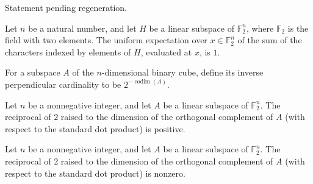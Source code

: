 \begin{theorem}
\label{FABL.subspaceCharacterSum_eq_zero_of_not_mem}
\leanok
{}
Statement pending regeneration.
\end{theorem}

\begin{theorem}
\label{FABL.expect_subspaceCharacterSum}
\leanok
{}
Let $n$ be a natural number, and let $H$ be a linear subspace of $\mathbb{F}_2^n$, where
$\mathbb{F}_2$ is the field with two elements. The uniform expectation over
$x\in\mathbb{F}_2^n$ of the sum of the characters indexed by elements of $H$, evaluated
at $x$, is $1$.
\end{theorem}

\begin{definition}
\label{FABL.inversePerpendicularCard}
\leanok
{}
For a subspace $A$ of the $n$-dimensional binary cube, define its inverse perpendicular
cardinality to be $2^{-\operatorname{codim}(A)}$.
\end{definition}

\begin{theorem}
\label{FABL.inversePerpendicularCard_pos}
\leanok
{}
Let $n$ be a nonnegative integer, and let $A$ be a linear subspace of $\mathbb F_2^n$.
The reciprocal of $2$ raised to the dimension of the orthogonal complement of $A$ (with
respect to the standard dot product) is positive.
\end{theorem}

\begin{theorem}
\label{FABL.inversePerpendicularCard_ne_zero}
\leanok
{}
Let $n$ be a nonnegative integer, and let $A$ be a linear subspace of $\mathbb F_2^n$.
The reciprocal of $2$ raised to the dimension of the orthogonal complement of $A$ (with
respect to the standard dot product) is nonzero.
\end{theorem}

